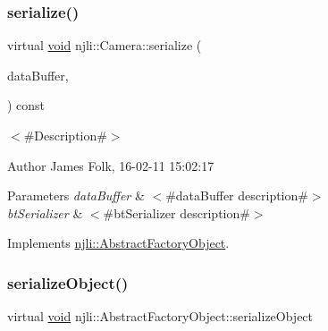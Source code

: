 \mbox{\label{classnjli_1_1_camera_a5325bfcff03dcbe482f2d3ba080eb3a5}} 
\subsubsection{\texorpdfstring{serialize()}{serialize()}}
{\footnotesize\ttfamily virtual \mbox{\hyperlink{_thread_8h_af1e856da2e658414cb2456cb6f7ebc66}{void}} njli\+::\+Camera\+::serialize (\begin{DoxyParamCaption}\item[{\mbox{\hyperlink{_thread_8h_af1e856da2e658414cb2456cb6f7ebc66}{void}} $\ast$}]{data\+Buffer,  }\item[{bt\+Serializer $\ast$}]{ }\end{DoxyParamCaption}) const\hspace{0.3cm}{\ttfamily [virtual]}}



$<$\#\+Description\#$>$ 

\begin{DoxyAuthor}{Author}
James Folk, 16-\/02-\/11 15\+:02\+:17
\end{DoxyAuthor}

\begin{DoxyParams}{Parameters}
{\em data\+Buffer} & $<$\#data\+Buffer description\#$>$ \\
\hline
{\em bt\+Serializer} & $<$\#bt\+Serializer description\#$>$ \\
\hline
\end{DoxyParams}


Implements \mbox{\hyperlink{classnjli_1_1_abstract_factory_object_aad2fbe86fb3bdecf02918a96b9c57976}{njli\+::\+Abstract\+Factory\+Object}}.

\mbox{\label{classnjli_1_1_camera_a4fc4bcd9d1930911474210c047372fc0}} 
\subsubsection{\texorpdfstring{serialize\+Object()}{serializeObject()}}
{\footnotesize\ttfamily virtual \mbox{\hyperlink{_thread_8h_af1e856da2e658414cb2456cb6f7ebc66}{void}} njli\+::\+Abstract\+Factory\+Object\+::serialize\+Object}

